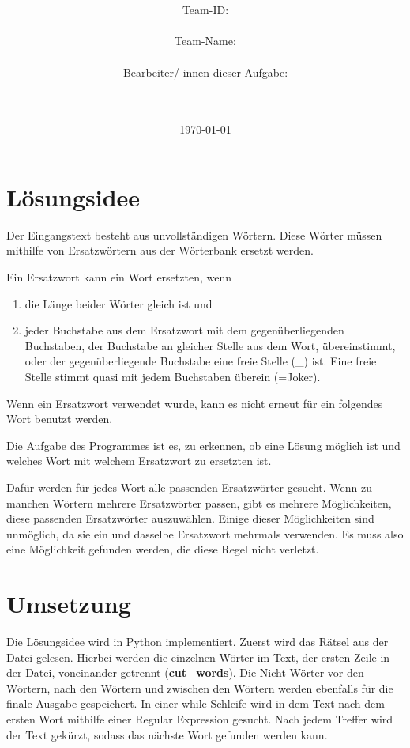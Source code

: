 \documentclass[a4paper,10pt,ngerman]{scrartcl}
\title{\textbf{\Huge\Aufgabe}}
\author{\LARGE Team-ID: \LARGE \TeamId \\\\
	    \LARGE Team-Name: \LARGE \TeamName \\\\
	    \LARGE Bearbeiter/-innen dieser Aufgabe: \\ 
	    \LARGE \Namen\\\\}
\date{\LARGE\today}
\begin{document}
\maketitle
\tableofcontents

\vspace{0.5cm}

\section{Lösungsidee}

Der Eingangstext besteht aus unvollständigen Wörtern.
Diese Wörter müssen mithilfe von Ersatzwörtern aus der Wörterbank ersetzt werden.

Ein Ersatzwort kann ein Wort ersetzten, wenn
\begin{enumerate}
    \item die Länge beider Wörter gleich ist und
    \item jeder Buchstabe aus dem Ersatzwort mit dem gegenüberliegenden Buchstaben, der Buchstabe an gleicher Stelle aus dem Wort, übereinstimmt, oder der gegenüberliegende Buchstabe eine freie Stelle (\glqq \_\grqq{}) ist.
    Eine freie Stelle stimmt quasi mit jedem Buchstaben überein (=Joker).
\end{enumerate}
Wenn ein Ersatzwort verwendet wurde, kann es nicht erneut für ein folgendes Wort benutzt werden.

Die Aufgabe des Programmes ist es, zu erkennen, ob eine Lösung möglich ist und welches Wort mit welchem Ersatzwort zu ersetzten ist.

Dafür werden für jedes Wort alle passenden Ersatzwörter gesucht.
Wenn zu manchen Wörtern mehrere Ersatzwörter passen, gibt es mehrere Möglichkeiten, diese passenden Ersatzwörter auszuwählen.
Einige dieser Möglichkeiten sind unmöglich, da sie ein und dasselbe Ersatzwort mehrmals verwenden.
Es muss also eine Möglichkeit gefunden werden, die diese Regel nicht verletzt.

\section{Umsetzung}

Die Lösungsidee wird in Python implementiert.
Zuerst wird das Rätsel aus der Datei gelesen.
Hierbei werden die einzelnen Wörter im Text, der ersten Zeile in der Datei, voneinander getrennt (\textbf{cut\_words}).
Die Nicht-Wörter vor den Wörtern, nach den Wörtern und zwischen den Wörtern werden ebenfalls für die finale Ausgabe gespeichert. 
In einer while-Schleife wird in dem Text nach dem ersten Wort mithilfe einer Regular Expression gesucht.
Nach jedem Treffer wird der Text gekürzt, sodass das nächste Wort gefunden werden kann.
\end{document}
